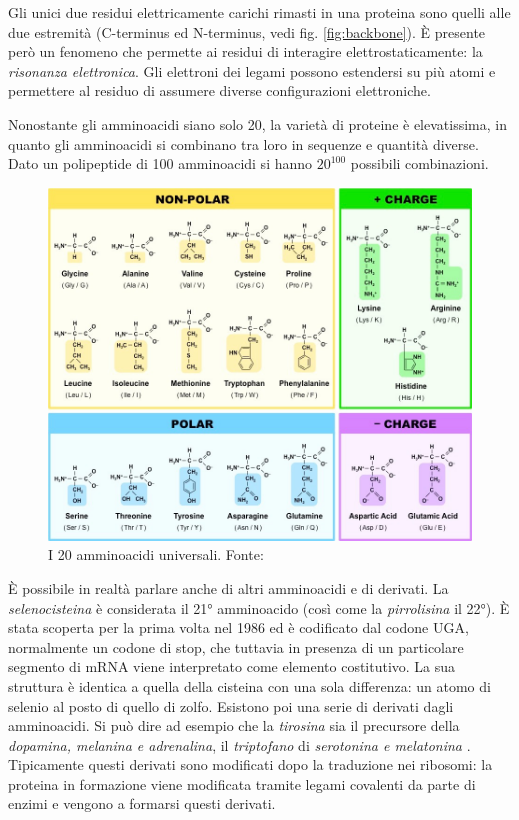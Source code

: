 Gli unici due residui elettricamente carichi rimasti in una proteina sono quelli alle due estremità (C-terminus ed N-terminus, vedi fig. \ref{fig:backbone}). È presente però un fenomeno che permette ai residui di interagire elettrostaticamente: la \textit{risonanza elettronica}. Gli elettroni dei legami possono estendersi su più atomi e permettere al residuo di assumere diverse configurazioni elettroniche. 

\par Nonostante gli amminoacidi siano solo 20, la varietà di proteine è elevatissima, in quanto gli amminoacidi si combinano tra loro in sequenze e quantità diverse. Dato un polipeptide di 100 amminoacidi si hanno $20^{100}$ possibili combinazioni. 

\begin{figure}[h]
	\centering
	\includegraphics[scale=0.4]{images/aminoacid-tipi.jpeg}
	\caption{I 20 amminoacidi universali. Fonte: \cite{aminoacidTipi}}
	\label{fig:amminoacidi-tipi}
\end{figure}

È possibile in realtà parlare anche di altri amminoacidi e di derivati. La \textit{selenocisteina} è considerata il 21° amminoacido (così come la \textit{pirrolisina} il 22°). È stata scoperta per la prima volta nel 1986 ed è codificato dal codone UGA, normalmente un codone di stop, che tuttavia in presenza di un particolare segmento di mRNA viene interpretato come elemento costitutivo. La sua struttura è identica a quella della cisteina con una sola differenza: un atomo di selenio al posto di quello di zolfo. Esistono poi una serie di derivati dagli amminoacidi. Si può dire ad esempio che la \textit{tirosina} sia il precursore della \textit{dopamina, melanina e adrenalina}, il \textit{triptofano} di \textit{serotonina e melatonina }. Tipicamente questi derivati sono modificati dopo la traduzione nei ribosomi: la proteina in formazione viene modificata tramite legami covalenti da parte di enzimi e vengono a formarsi questi derivati.

